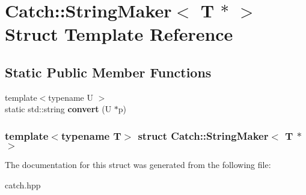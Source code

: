 \hypertarget{structCatch_1_1StringMaker_3_01T_01_5_01_4}{
\section{Catch::StringMaker$<$ T $\ast$ $>$ Struct Template Reference}
\label{structCatch_1_1StringMaker_3_01T_01_5_01_4}
}
\subsection*{Static Public Member Functions}
\begin{DoxyCompactItemize}
\item 
\hypertarget{structCatch_1_1StringMaker_3_01T_01_5_01_4_ad355859b885d7042c407ec4bbec97214}{
{\footnotesize template$<$typename U $>$ }\\static std::string {\bfseries convert} (U $\ast$p)}
\label{structCatch_1_1StringMaker_3_01T_01_5_01_4_ad355859b885d7042c407ec4bbec97214}

\end{DoxyCompactItemize}
\subsubsection*{template$<$typename T$>$ struct Catch::StringMaker$<$ T $\ast$ $>$}



The documentation for this struct was generated from the following file:\begin{DoxyCompactItemize}
\item 
catch.hpp\end{DoxyCompactItemize}
